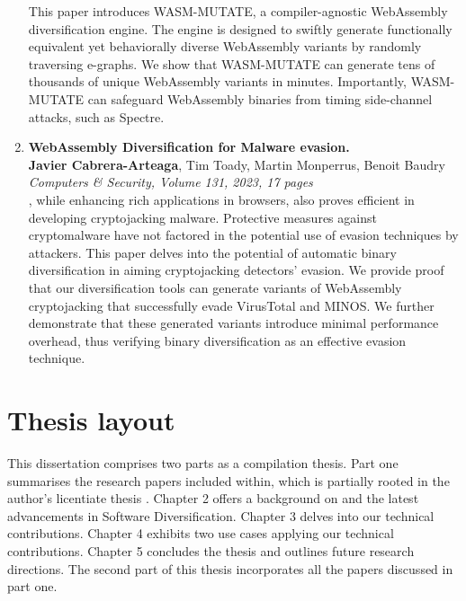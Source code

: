 \begin{enumerate}[label={\textbf{\Roman*}:}, ref={\Roman*}]
	This paper introduces WASM-MUTATE, a compiler-agnostic WebAssembly diversification engine. 
	The engine is designed to swiftly generate functionally equivalent yet behaviorally diverse WebAssembly variants by randomly traversing e-graphs. 
	We show that WASM-MUTATE can generate tens of thousands of unique WebAssembly variants in minutes. 
	Importantly, WASM-MUTATE can safeguard WebAssembly binaries from timing side-channel attacks, such as Spectre.



	\item \label{evasionpaper} \textbf{WebAssembly Diversification for Malware evasion.} \\ 
	\textbf{Javier Cabrera-Arteaga}, Tim Toady, Martin Monperrus, Benoit Baudry\\
	\textit{Computers \& Security, Volume 131, 2023, 17 pages} \\

	  \Wasm, while enhancing rich applications in browsers, also proves efficient in developing cryptojacking malware. 
	Protective measures against cryptomalware have not factored in the potential use of evasion techniques by attackers. 
	This paper delves into the potential of automatic binary diversification in aiming \Wasm cryptojacking detectors' evasion. 
	We provide proof that our diversification tools can generate variants of WebAssembly cryptojacking that successfully evade VirusTotal and MINOS. 
	We further demonstrate that these generated variants introduce minimal performance overhead, thus verifying binary diversification as an effective evasion technique.

\end{enumerate}



\section*{Thesis layout}
This dissertation comprises two parts as a compilation thesis. 
Part one summarises the research papers included within, which is partially rooted in the author's licentiate thesis \cite{Lic}. 
Chapter 2 offers a background on \Wasm and the latest advancements in Software Diversification.  
Chapter 3 delves into our technical contributions. 
Chapter 4 exhibits two use cases applying our technical contributions. 
Chapter 5 concludes the thesis and outlines future research directions. 
The second part of this thesis incorporates all the papers discussed in part one.


